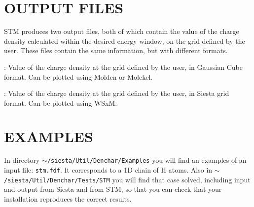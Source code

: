 \section{OUTPUT FILES}
\label{cap:output} 

{\sc STM} produces two output files, both of which contain
the value of the charge density calculated within the
desired energy window, on the grid defined by the user.
These files contain the same information, but with different
formats.

\begin{description}
\itemsep 10pt
\parsep 0pt

\item[{\bf {\it SystemLabel}.STM.cube}]:
Value of the charge density at the grid defined by the user,
in Gaussian Cube format. Can be plotted using {\sc Molden}
or {\sc Molekel}.

\item[{\bf {\it SystemLabel}.STM.siesta}]:
Value of the charge density at the grid defined by the user,
in {\sc Siesta} grid format. Can be plotted using WSxM.


\end{description}



\section{EXAMPLES}

In directory {\tt $\sim$/siesta/Util/Denchar/Examples} you will find an
examples of an input file: {\tt stm.fdf}.  It corresponds
to a 1D chain of H atoms.
Also in {\tt $\sim$/siesta/Util/Denchar/Tests/STM} you will find that
case solved, including input and output from {\sc Siesta}
and from {\sc STM}, so that you can check that your installation
reproduces the correct results.


